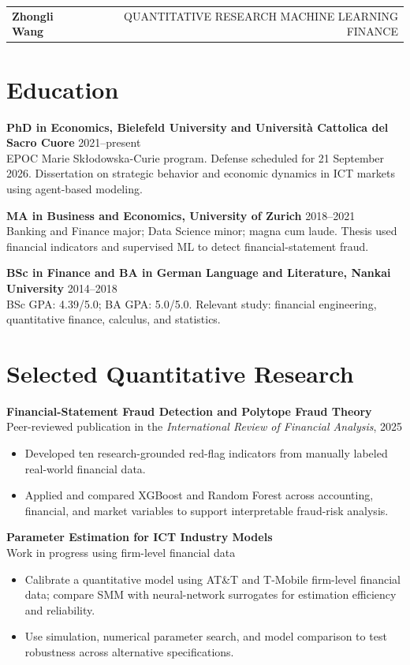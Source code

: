 \documentclass[a4paper,11pt]{article}
\newcommand{\project}[2]{%
  \textbf{#1}\\[-1pt]
  \textcolor{muted}{\small #2}\par
}
\begin{document}
\newpage
\begin{tabularx}{\linewidth}{@{}Xr@{}}
  {\large\textbf{\textcolor{accent}{Zhongli Wang}}} &
  {\small\textcolor{muted}{QUANTITATIVE RESEARCH \textbar{} MACHINE LEARNING \textbar{} FINANCE}}\\
\end{tabularx}

\section{Education}
\textbf{PhD in Economics, Bielefeld University and Universit\`a Cattolica del Sacro Cuore} \hfill 2021--present\\
EPOC Marie Sk\l odowska-Curie program. Defense scheduled for 21 September 2026. Dissertation on strategic behavior and economic dynamics in ICT markets using agent-based modeling.

\textbf{MA in Business and Economics, University of Zurich} \hfill 2018--2021\\
Banking and Finance major; Data Science minor; magna cum laude. Thesis used financial indicators and supervised ML to detect financial-statement fraud.

\textbf{BSc in Finance and BA in German Language and Literature, Nankai University} \hfill 2014--2018\\
BSc GPA: 4.39/5.0; BA GPA: 5.0/5.0. Relevant study: financial engineering, quantitative finance, calculus, and statistics.

\section{Selected Quantitative Research}
\project{Financial-Statement Fraud Detection and Polytope Fraud Theory}{Peer-reviewed publication in the \textit{International Review of Financial Analysis}, 2025}
\begin{itemize}
  \item Developed ten research-grounded red-flag indicators from manually labeled real-world financial data.
  \item Applied and compared XGBoost and Random Forest across accounting, financial, and market variables to support interpretable fraud-risk analysis.
\end{itemize}

\project{Parameter Estimation for ICT Industry Models}{Work in progress using firm-level financial data}
\begin{itemize}
  \item Calibrate a quantitative model using AT\&T and T-Mobile firm-level financial data; compare SMM with neural-network surrogates for estimation efficiency and reliability.
  \item Use simulation, numerical parameter search, and model comparison to test robustness across alternative specifications.
\end{itemize}
\end{document}
